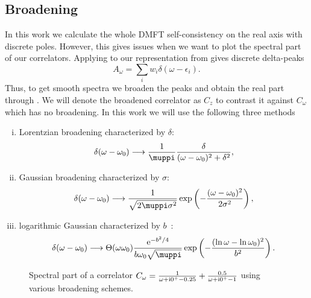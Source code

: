 \subsection{Broadening}

In this work we calculate the whole DMFT self-consistency on the real axis with discrete poles.
However, this gives issues when we want to plot the spectral part of our correlators.
Applying  to our representation from 
gives discrete delta-peaks
\begin{equation}
    A_\omega = \sum_i w_i \delta(\omega - \epsilon_i).
    \label{eq:spectrum-discrete}
\end{equation}
Thus, to get smooth spectra we broaden the peaks
and obtain the real part through .
We will denote the broadened correlator as $C_z$
to contrast it against $C_\omega$ which has no broadening.
In this work we will use the following three methods
\begin{enumerate}[(i)]
    \item Lorentzian broadening characterized by $\delta$:%
          \begin{equation}
              \delta(\omega - \omega_0)
              \longrightarrow
              \frac{1}{\muppi}\frac{\delta}{(\omega - \omega_0)^2 + \delta^2},
          \end{equation}
    \item Gaussian broadening characterized by $\sigma$:%
          \begin{equation}
              \delta(\omega - \omega_0)
              \longrightarrow
              \frac{1}{\sqrt{2\muppi \sigma^2}}\exp\left(-\frac{(\omega - \omega_0)^2}{2\sigma^2}\right),
          \end{equation}
    \item logarithmic Gaussian characterized by $b$~\cite{Bulla2008}:%
          \begin{equation}
              \delta(\omega - \omega_0)
              \longrightarrow
              \Theta(\omega\omega_0)\frac{\me^{-b^2/4}}{b\omega_0\sqrt{\muppi}}\exp\left(-\frac{(\ln\omega-\ln\omega_0)^2}{b^2}\right).
          \end{equation}
\end{enumerate}

\begin{figure}[ht]
    \centering
    
    \caption{
        Spectral part of a correlator
        $C_\omega = \frac{1}{\omega + \mathrm{i}0^+ - 0.25} + \frac{0.5}{\omega + \mathrm{i}0^+ - 1}$
        using various broadening schemes.
    }%
    \label{fig:broadening}
\end{figure}

